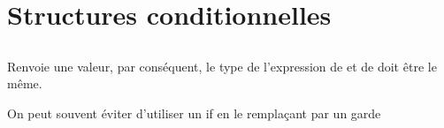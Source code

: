 \section{Structures conditionnelles}
\label{conditionals}

\subsection{ }

Renvoie une valeur, par conséquent, le type de l'expression de  et de  doit être le même.

On peut souvent éviter d'utiliser un if en le remplaçant par un garde 

\subsection{ }
